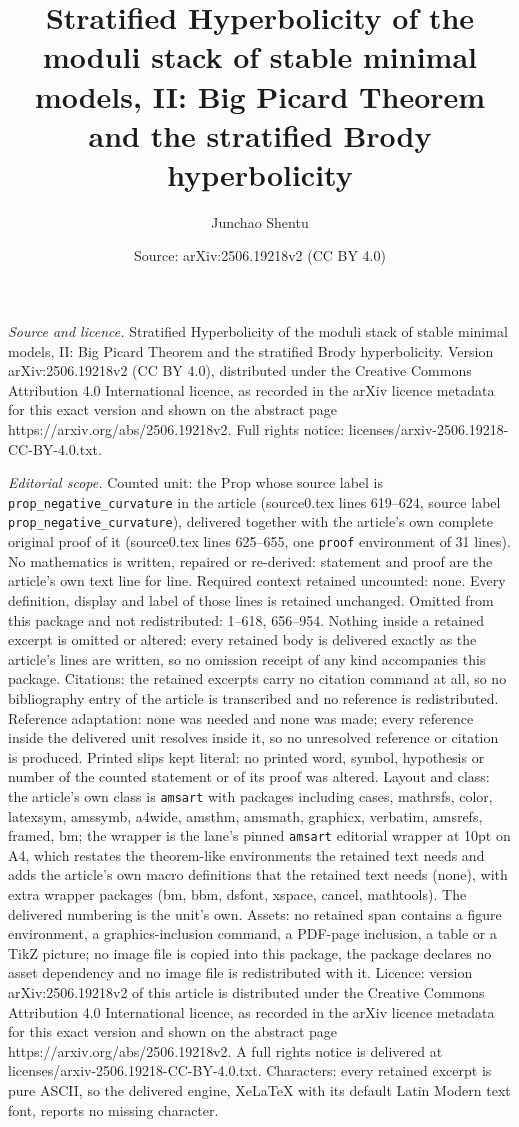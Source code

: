 \documentclass[10pt,a4paper]{amsart}
\title[Stratified Hyperbolicity of the moduli stack of stable minim]{Stratified Hyperbolicity of the moduli stack of stable minimal models, II: Big Picard Theorem and the stratified Brody hyperbolicity}
\author{Junchao Shentu}
\date{Source: arXiv:2506.19218v2 (CC BY 4.0)}
\begin{document}
\maketitle

\noindent\emph{Source and licence.} Stratified Hyperbolicity of the moduli stack of stable minimal models, II: Big Picard Theorem and the stratified Brody hyperbolicity. Version arXiv:2506.19218v2 (CC BY 4.0), distributed under the Creative Commons Attribution 4.0 International licence, as recorded in the arXiv licence metadata for this exact version and shown on the abstract page https://arxiv.org/abs/2506.19218v2. Full rights notice: licenses/arxiv-2506.19218-CC-BY-4.0.txt.\par\smallskip

\noindent\textit{Editorial scope.} Counted unit: the Prop whose source label is \texttt{prop\_negative\_curvature} in the article (source0.tex lines 619--624, source label \texttt{prop\_negative\_curvature}), delivered together with the article's own complete original proof of it (source0.tex lines 625--655, one \texttt{proof} environment of 31 lines). No mathematics is written, repaired or re-derived: statement and proof are the article's own text line for line. Required context retained uncounted: none. Every definition, display and label of those lines is retained unchanged. Omitted from this package and not redistributed: 1--618, 656--954. Nothing inside a retained excerpt is omitted or altered: every retained body is delivered exactly as the article's lines are written, so no omission receipt of any kind accompanies this package. Citations: the retained excerpts carry no citation command at all, so no bibliography entry of the article is transcribed and no reference is redistributed. Reference adaptation: none was needed and none was made; every reference inside the delivered unit resolves inside it, so no unresolved reference or citation is produced. Printed slips kept literal: no printed word, symbol, hypothesis or number of the counted statement or of its proof was altered. Layout and class: the article's own class is \texttt{amsart} with packages including cases, mathrsfs, color, latexsym, amssymb, a4wide, amsthm, amsmath, graphicx, verbatim, amsrefs, framed, bm; the wrapper is the lane's pinned \texttt{amsart} editorial wrapper at 10pt on A4, which restates the theorem-like environments the retained text needs and adds the article's own macro definitions that the retained text needs (none), with extra wrapper packages (bm, bbm, dsfont, xspace, cancel, mathtools). The delivered numbering is the unit's own. Assets: no retained span contains a figure environment, a graphics-inclusion command, a PDF-page inclusion, a table or a TikZ picture; no image file is copied into this package, the package declares no asset dependency and no image file is redistributed with it. Licence: version arXiv:2506.19218v2 of this article is distributed under the Creative Commons Attribution 4.0 International licence, as recorded in the arXiv licence metadata for this exact version and shown on the abstract page https://arxiv.org/abs/2506.19218v2. A full rights notice is delivered at licenses/arxiv-2506.19218-CC-BY-4.0.txt. Characters: every retained excerpt is pure ASCII, so the delivered engine, XeLaTeX with its default Latin Modern text font, reports no missing character.
\end{document}
